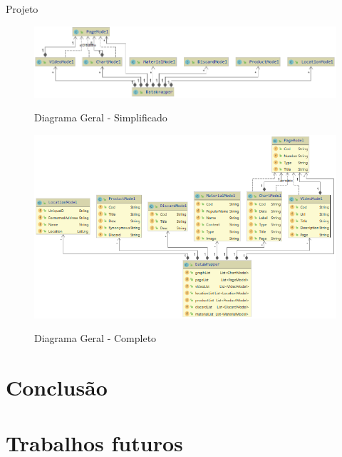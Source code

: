 \documentclass[
	12pt,				%
	openright,			%
	twoside,			%
	a4paper,			%
	english,			%
	french,				%
	spanish,			%
	brazil				%
	]{abntex2}
\begin{document}
\begin{chapter}{Projeto}
\begin{figure}[h]
\centering
   \caption{Diagrama Geral - Simplificado}
   \includegraphics[scale=0.7]{media/DataWrapper_.png}
     \label{fig:datawrapper_simp}
\end{figure}

\begin{figure}[h]
\centering
   \caption{Diagrama Geral - Completo}
   \includegraphics[scale=0.85]{media/DataWrapper.png}
     \label{fig:datawrapper_comp}
\end{figure}

\end{chapter}

\chapter{Conclusão}

\chapter{Trabalhos futuros}



\postextual
\end{document}
